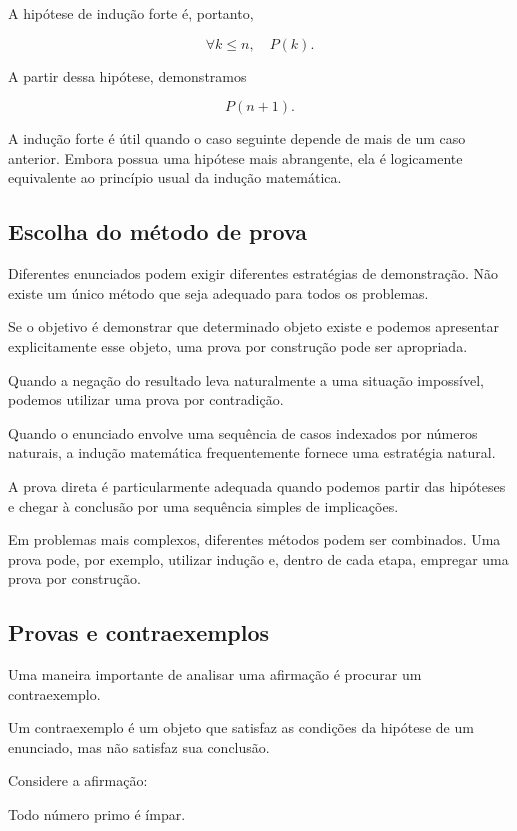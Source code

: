 \documentclass[
  brazilian,
  letterpaper,
]{book}
\theoremstyle{plain}
\theoremstyle{definition}
\theoremstyle{remark}
\begin{document}
A hipótese de indução forte é, portanto,

\[
\forall k\leq n,\quad P(k).
\]

A partir dessa hipótese, demonstramos

\[
P(n+1).
\]

A indução forte é útil quando o caso seguinte depende de mais de um caso
anterior. Embora possua uma hipótese mais abrangente, ela é logicamente
equivalente ao princípio usual da indução matemática.

\subsection{Escolha do método de
prova}\label{escolha-do-muxe9todo-de-prova}

Diferentes enunciados podem exigir diferentes estratégias de
demonstração. Não existe um único método que seja adequado para todos os
problemas.

Se o objetivo é demonstrar que determinado objeto existe e podemos
apresentar explicitamente esse objeto, uma prova por construção pode ser
apropriada.

Quando a negação do resultado leva naturalmente a uma situação
impossível, podemos utilizar uma prova por contradição.

Quando o enunciado envolve uma sequência de casos indexados por números
naturais, a indução matemática frequentemente fornece uma estratégia
natural.

A prova direta é particularmente adequada quando podemos partir das
hipóteses e chegar à conclusão por uma sequência simples de implicações.

Em problemas mais complexos, diferentes métodos podem ser combinados.
Uma prova pode, por exemplo, utilizar indução e, dentro de cada etapa,
empregar uma prova por construção.

\subsection{Provas e contraexemplos}\label{provas-e-contraexemplos}

Uma maneira importante de analisar uma afirmação é procurar um
contraexemplo.

Um contraexemplo é um objeto que satisfaz as condições da hipótese de um
enunciado, mas não satisfaz sua conclusão.

Considere a afirmação:

Todo número primo é ímpar.
\end{document}
